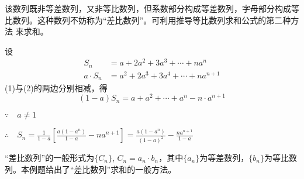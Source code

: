 \begin{analyze}
该数列既非等差数列，又非等比数列，但系数部分构成等差数列，字母部分构成等比数列。这种数列不妨称为“差比数列”。可利用推导等比数列求和公式的第二种方法
来求和。
\end{analyze}

\begin{solution}
设
\begin{align}
 S_n&=a+2a^2+3a^3+\cdots +na^n\tag{1}\\
    a\cdot S_n&=a^2+2a^3+3a^4+\cdots +na^{n+1} \tag{2}
\end{align}
(1)与(2)的两边分别相减，得
  \[  (1-a)S_n=a+a^2+\cdots +a^n-n\cdot a^{n+1}\]    

$\because\quad a\ne 1$

$\therefore\quad S_n=\frac{1}{1-a}\left[\frac{a(1-a^n)}{1-a}-na^{n+1}\right]=\frac{a(1-a^n)}{(1-a)^2}-\frac{na^{n+1}}{1-a}$
\end{solution}

\begin{rmk}
“差比数列”的一般形式为$\{C_n\}$, $C_n=a_n\cdot b_n$，其中$\{a_n\}$为等差数列，$\{b_n\}$为等比数列。本例题给出了“差比数列”求和的一般方法。    
\end{rmk}

